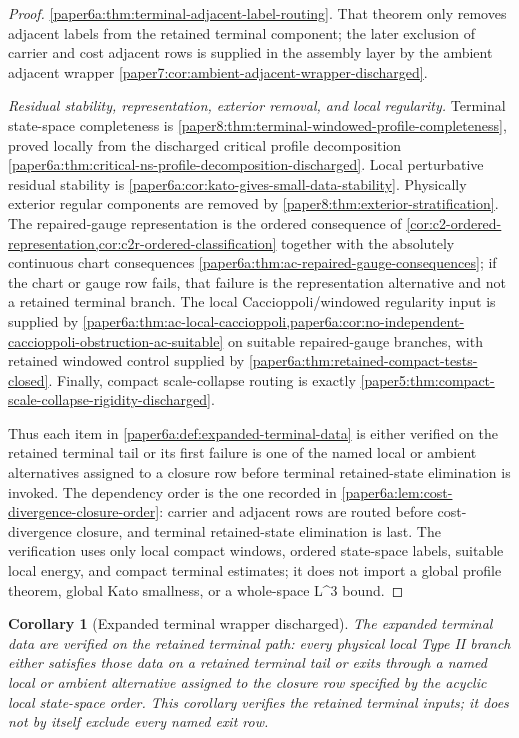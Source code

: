 \documentclass[11pt]{amsart}
\def\({}%
\def\){}%
\theoremstyle{plain}
\newtheorem{corollary}[corollary]{Corollary}
\theoremstyle{definition}
\theoremstyle{remark}
\begin{document}
\begin{proof}
\cref{paper6a:thm:terminal-adjacent-label-routing}.  That theorem only removes
adjacent labels from the retained terminal component; the later exclusion of
carrier and cost adjacent rows is supplied in the assembly layer by the ambient
adjacent wrapper \cref{paper7:cor:ambient-adjacent-wrapper-discharged}.
\par
\emph{Residual stability, representation, exterior removal, and local
regularity.}
Terminal state-space completeness is
\cref{paper8:thm:terminal-windowed-profile-completeness}, proved locally from
the discharged critical profile decomposition
\cref{paper6a:thm:critical-ns-profile-decomposition-discharged}.  Local
perturbative residual stability is
\cref{paper6a:cor:kato-gives-small-data-stability}.  Physically exterior
regular components are removed by
\cref{paper8:thm:exterior-stratification}.  The repaired-gauge representation
is the ordered consequence of
\cref{cor:c2-ordered-representation,cor:c2r-ordered-classification} together
with the absolutely continuous chart consequences
\cref{paper6a:thm:ac-repaired-gauge-consequences}; if the chart or gauge row
fails, that failure is the representation alternative and not a retained
terminal branch.  The local Caccioppoli/windowed regularity input is supplied
by
\cref{paper6a:thm:ac-local-caccioppoli,paper6a:cor:no-independent-caccioppoli-obstruction-ac-suitable}
on suitable repaired-gauge branches, with retained windowed control supplied
by \cref{paper6a:thm:retained-compact-tests-closed}.  Finally, compact
scale-collapse routing is exactly
\cref{paper5:thm:compact-scale-collapse-rigidity-discharged}.
\par
Thus each item in \cref{paper6a:def:expanded-terminal-data} is either verified
on the retained terminal tail or its first failure is one of the named local or
ambient alternatives assigned to a closure row before terminal retained-state
elimination is invoked.  The dependency order is the one recorded in
\cref{paper6a:lem:cost-divergence-closure-order}: carrier and adjacent rows are
routed before cost-divergence closure, and terminal retained-state elimination
is last.  The verification uses only local compact windows, ordered state-space
labels, suitable local energy, and compact terminal estimates; it does not
import a global profile theorem, global Kato smallness, or a whole-space
\(L^3\) bound.
\end{proof}

\begin{corollary}[Expanded terminal wrapper discharged]
\label{paper6a:cor:expanded-terminal-wrapper-discharged}
The expanded terminal data are verified on the retained terminal path: every
physical local Type II branch either satisfies those data on a retained
terminal tail or exits through a named local or ambient
alternative assigned to the closure row specified by the acyclic local
state-space order.  This corollary verifies the retained terminal inputs; it
does not by itself exclude every named exit row.
\end{corollary}
\end{document}
